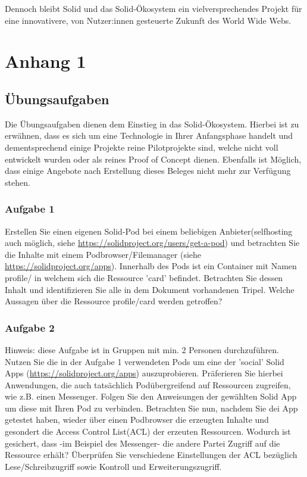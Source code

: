 \documentclass[acmtog]{acmart}
\begin{document}
Dennoch bleibt Solid und das Solid-Ökosystem ein vielversprechendes Projekt für eine innovativere, von Nutzer:innen gesteuerte Zukunft des World Wide Webs.




\appendix

\section{Anhang 1}

\subsection{Übungsaufgaben}
Die Übungsaufgaben dienen dem Einstieg in das Solid-Ökosystem. Hierbei ist zu erwähnen, dass es sich um eine Technologie in Ihrer Anfangsphase handelt und dementsprechend einige Projekte reine Pilotprojekte sind, welche nicht voll entwickelt wurden oder als reines Proof of Concept dienen. Ebenfalls ist Möglich, dass einige Angebote nach Erstellung dieses Beleges nicht mehr zur Verfügung stehen.
\subsubsection{Aufgabe 1}
Erstellen Sie einen eigenen Solid-Pod bei einem beliebigen Anbieter(selfhosting auch möglich, siehe \url{https://solidproject.org/users/get-a-pod}) und betrachten Sie die Inhalte mit einem Podbrowser/Filemanager (siehe \url{https://solidproject.org/apps}). Innerhalb des Pods ist ein Container mit Namen profile/ in welchem sich die Ressource 'card' befindet. Betrachten Sie dessen Inhalt und identifizieren Sie alle in dem Dokument vorhandenen Tripel. Welche Aussagen über die Ressource profile/card werden getroffen?
\subsubsection{Aufgabe 2}
Hinweis: diese Aufgabe ist in Gruppen mit min. 2 Personen durchzuführen.
Nutzen Sie die in der Aufgabe 1 verwendeten Pods um eine der 'social' Solid Apps (\url{https://solidproject.org/apps}) auszuprobieren. Präferieren Sie hierbei Anwendungen, die auch tatsächlich Podübergreifend auf Ressourcen zugreifen, wie z.B. einen Messenger. Folgen Sie den Anweisungen der gewählten Solid App um diese mit Ihren Pod zu verbinden. Betrachten Sie nun, nachdem Sie dei App getestet haben, wieder über einen Podbrowser die erzeugten Inhalte und gesondert die Access Control List(ACL) der erzeuten Ressourcen.
Wodurch ist gesichert, dass -im Beispiel des Messenger- die andere Partei Zugriff auf die Ressource erhält? Überprüfen Sie verschiedene Einstellungen der ACL bezüglich Lese/Schreibzugriff sowie Kontroll und Erweiterungszugriff. 
\end{document}
